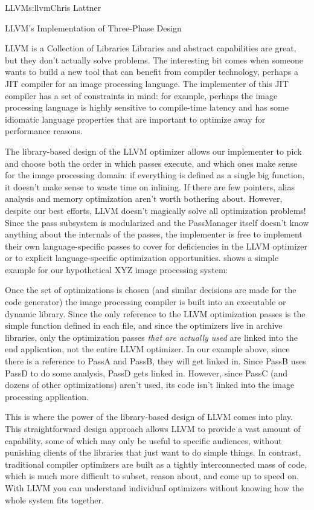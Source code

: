\begin{aosachapter}{LLVM}{s:llvm}{Chris Lattner}
\begin{aosasect1}{LLVM's Implementation of Three-Phase Design}
\begin{aosasect2}{LLVM is a Collection of Libraries}
Libraries and abstract capabilities are great, but they don't actually
solve problems.  The interesting bit comes when someone wants to build
a new tool that can benefit from compiler technology, perhaps a JIT
compiler for an image processing language.  The implementer of this
JIT compiler has a set of constraints in mind: for example, perhaps
the image processing language is highly sensitive to compile-time
latency and has some idiomatic language properties that are important
to optimize away for performance reasons.

The library-based design of the LLVM optimizer allows our implementer
to pick and choose both the order in which passes execute, and which
ones make sense for the image processing domain: if everything is
defined as a single big function, it doesn't make sense to waste time
on inlining.  If there are few pointers, alias analysis and memory
optimization aren't worth bothering about.  However, despite our best
efforts, LLVM doesn't magically solve all optimization problems!
Since the pass subsystem is modularized and the PassManager itself
doesn't know anything about the internals of the passes, the
implementer is free to implement their own language-specific passes to
cover for deficiencies in the LLVM optimizer or to explicit
language-specific optimization opportunities.
 shows a simple example for our hypothetical
XYZ image processing system:


Once the set of optimizations is chosen (and similar decisions are
made for the code generator) the image processing compiler is built
into an executable or dynamic library.  Since the only reference to
the LLVM optimization passes is the simple  function
defined in each  file, and since the optimizers live in
 archive libraries, only the optimization passes \emph{that
are actually used} are linked into the end application, not the
entire LLVM optimizer.  In our example above, since there is a
reference to PassA and PassB, they will get linked in.  Since PassB
uses PassD to do some analysis, PassD gets linked in.  However, since
PassC (and dozens of other optimizations) aren't used, its code isn't
linked into the image processing application.

This is where the power of the library-based design of LLVM comes into
play. This straightforward design approach allows LLVM to provide a
vast amount of capability, some of which may only be useful to
specific audiences, without punishing clients of the libraries that
just want to do simple things. In contrast, traditional compiler
optimizers are built as a tightly interconnected mass of code, which
is much more difficult to subset, reason about, and come up to speed
on. With LLVM you can understand individual optimizers without knowing
how the whole system fits together.


\end{aosasect2}
\end{aosasect1}
\end{aosachapter}
